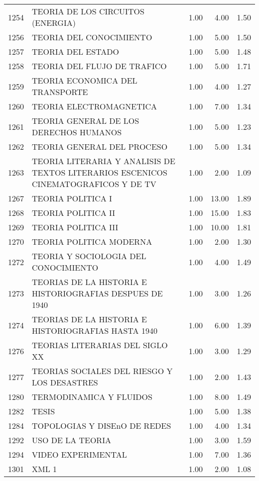 \documentclass[12pt]{article}
\begin{document}
\begin{table}[ht]
\begin{tabular}{rlrrr}
  1254 & TEORIA DE LOS CIRCUITOS (ENERGIA) & 1.00 & 4.00 & 1.50 \\ 
  1256 & TEORIA DEL CONOCIMIENTO & 1.00 & 5.00 & 1.50 \\ 
  1257 & TEORIA DEL ESTADO & 1.00 & 5.00 & 1.48 \\ 
  1258 & TEORIA DEL FLUJO DE TRAFICO & 1.00 & 5.00 & 1.71 \\ 
  1259 & TEORIA ECONOMICA DEL TRANSPORTE & 1.00 & 4.00 & 1.27 \\ 
  1260 & TEORIA ELECTROMAGNETICA & 1.00 & 7.00 & 1.34 \\ 
  1261 & TEORIA GENERAL DE LOS DERECHOS HUMANOS & 1.00 & 5.00 & 1.23 \\ 
  1262 & TEORIA GENERAL DEL PROCESO & 1.00 & 5.00 & 1.34 \\ 
  1263 & TEORIA LITERARIA Y ANALISIS DE TEXTOS LITERARIOS ESCENICOS CINEMATOGRAFICOS Y DE TV & 1.00 & 2.00 & 1.09 \\ 
  1267 & TEORIA POLITICA I & 1.00 & 13.00 & 1.89 \\ 
  1268 & TEORIA POLITICA II & 1.00 & 15.00 & 1.83 \\ 
  1269 & TEORIA POLITICA III & 1.00 & 10.00 & 1.81 \\ 
  1270 & TEORIA POLITICA MODERNA & 1.00 & 2.00 & 1.30 \\ 
  1272 & TEORIA Y SOCIOLOGIA DEL CONOCIMIENTO & 1.00 & 4.00 & 1.49 \\ 
  1273 & TEORIAS DE LA HISTORIA E HISTORIOGRAFIAS DESPUES DE 1940 & 1.00 & 3.00 & 1.26 \\ 
  1274 & TEORIAS DE LA HISTORIA E HISTORIOGRAFIAS HASTA 1940 & 1.00 & 6.00 & 1.39 \\ 
  1276 & TEORIAS LITERARIAS DEL SIGLO XX & 1.00 & 3.00 & 1.29 \\ 
  1277 & TEORIAS SOCIALES DEL RIESGO Y LOS DESASTRES & 1.00 & 2.00 & 1.43 \\ 
  1280 & TERMODINAMICA Y FLUIDOS & 1.00 & 8.00 & 1.49 \\ 
  1282 & TESIS & 1.00 & 5.00 & 1.38 \\ 
  1284 & TOPOLOGIAS Y DISEnO DE REDES & 1.00 & 4.00 & 1.34 \\ 
  1292 & USO DE LA TEORIA & 1.00 & 3.00 & 1.59 \\ 
  1294 & VIDEO EXPERIMENTAL & 1.00 & 7.00 & 1.36 \\ 
  1301 & XML 1 & 1.00 & 2.00 & 1.08 \\ 
   \hline
\end{tabular}
\end{table}
\end{document}
